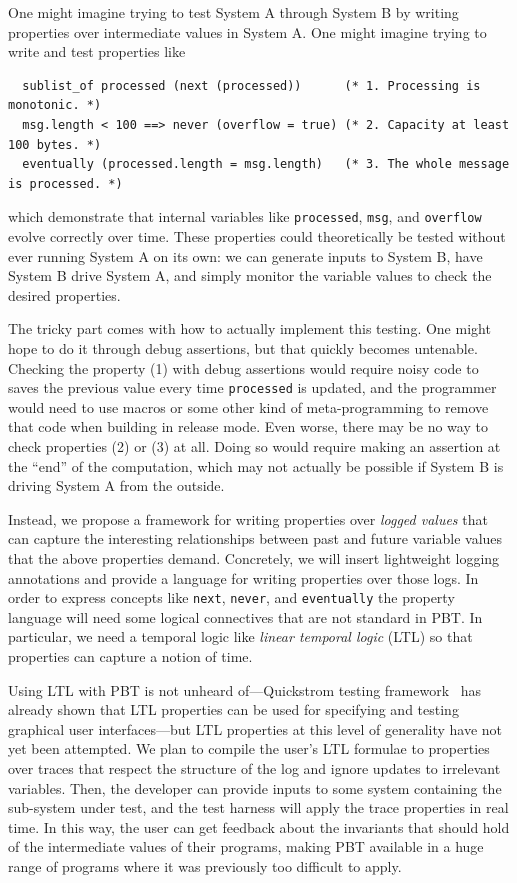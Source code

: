 One might imagine trying to test System A through System B by writing properties
over intermediate values in System A. One might imagine trying to write and
test properties like
\begin{lstlisting}
  sublist_of processed (next (processed))      (* 1. Processing is monotonic. *)
  msg.length < 100 ==> never (overflow = true) (* 2. Capacity at least 100 bytes. *)
  eventually (processed.length = msg.length)   (* 3. The whole message is processed. *)
\end{lstlisting}
which demonstrate that internal variables like \lstinline{processed},
\lstinline{msg}, and \lstinline{overflow} evolve correctly over time.
These properties could theoretically be tested without ever running System A on
its own: we can generate inputs to System B, have System B drive System A, and
simply monitor the variable values to check the desired properties.

The tricky part comes with how to actually implement this testing. One might
hope to do it through debug assertions, but that quickly becomes untenable.
Checking the property (1) with debug assertions would require noisy code to
saves the previous value every time \lstinline{processed} is updated, and the
programmer would need to use macros or some other kind of meta-programming to
remove that code when building in release mode. Even worse, there may be no way
to check properties (2) or (3) at all. Doing so would require making an
assertion at the ``end'' of the computation, which may not actually be possible
if System B is driving System A from the outside.

Instead, we propose a framework for writing properties over {\em logged values}
that can capture the interesting relationships between past and future variable
values that the above properties demand.  Concretely, we will insert lightweight
logging annotations and provide a language for writing properties over those
logs. In order to express concepts like \lstinline{next}, \lstinline{never}, and
\lstinline{eventually} the property language will need some logical connectives
that are not standard in PBT.  In particular, we need a temporal logic like {\em
linear temporal logic} (LTL) so that properties can capture a notion of time.

Using LTL with PBT is not unheard of---Quickstrom testing
framework~\cite{oconnor_quickstrom_2022} has already shown that LTL properties
can be used for specifying and testing graphical user interfaces---but LTL
properties at this level of generality have not yet been attempted. We plan to
compile the user's LTL formulae to properties over traces that respect the
structure of the log and ignore updates to irrelevant variables. Then, the
developer can provide inputs to some system containing the sub-system under
test, and the test harness will apply the trace properties in real time. In this
way, the user can get feedback about the invariants that should hold of the
intermediate values of their programs, making PBT available in a huge range of
programs where it was previously too difficult to apply.

